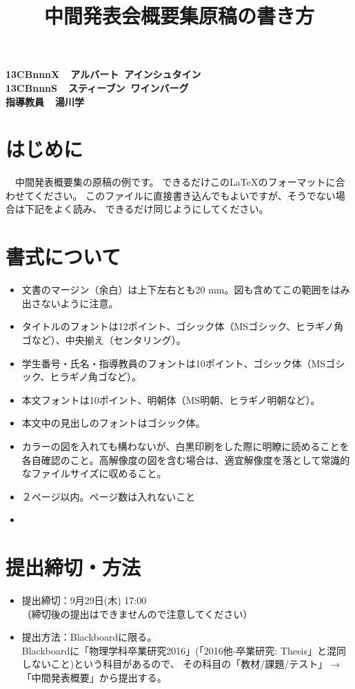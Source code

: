 \documentclass[10pt]{article}
\title{{\large {\bf 中間発表会概要集原稿の書き方}}}
\author{}
\date{}
\begin{document}
    \maketitle
    \thispagestyle{empty}
    \vspace{-15mm}	
    \begin{flushright}
    {\bf 13CBnnnX~~アルバート~アインシュタイン}
    \\
    {\bf 13CBnnnS~~スティーブン~ワインバーグ}
    \\
    {\bf 指導教員~~湯川学}
    \end{flushright}
    
    
    \section{{\normalsize はじめに}}
    　中間発表概要集の原稿の例です。
    できるだけこの\LaTeX{}のフォーマットに合わせてください。
    このファイルに直接書き込んでもよいですが、そうでない場合は下記をよく読み、
    できるだけ同じようにしてください。
    
    \section{{\normalsize 書式について}}
    \begin{itemize}
    \item 文書のマージン（余白）は上下左右とも20 mm。図も含めてこの範囲をはみ出さないように注意。
    \item タイトルのフォントは12ポイント、ゴシック体（MSゴシック、ヒラギノ角ゴなど）、中央揃え（センタリング）。
    \item 学生番号・氏名・指導教員のフォントは10ポイント、ゴシック体（MSゴシック、ヒラギノ角ゴなど）。
    \item 本文フォントは10ポイント、明朝体（MS明朝、ヒラギノ明朝など）。
    \item 本文中の見出しのフォントはゴシック体。
    \item カラーの図を入れても構わないが、白黒印刷をした際に明瞭に読めることを各自確認のこと。高解像度の図を含む場合は、適宜解像度を落として常識的なファイルサイズに収めること。
    \item ２ページ以内。ページ数は入れないこと
    \item {}
    \end{itemize}
    
    \section{{\normalsize 提出締切・方法}}
    \begin{itemize}
    \item 提出締切：9月29日(木) 17:00 \\
    （締切後の提出はできませんので注意してください）
    \item 提出方法：Blackboardに限る。\\
    Blackboardに「物理学科卒業研究2016」(「2016他-卒業研究: Thesis」と混同しないこと)という科目があるので、
    その科目の「教材/課題/テスト」$\to$「中間発表概要」から提出する。
    \end{itemize}
    
\end{document}
